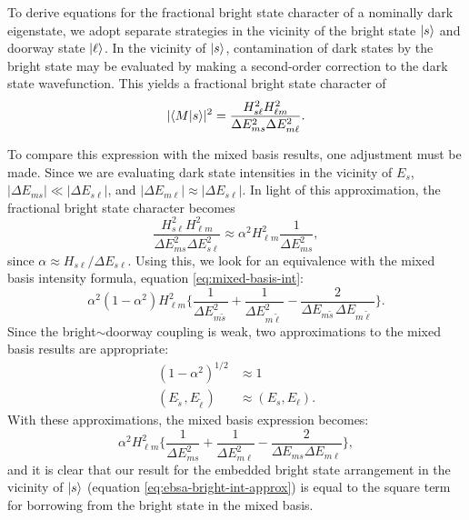 \documentclass[12pt]{mitthesis}
\newcommand{\ts}{\tilde{s}\,}
\newcommand{\tl}{\tilde{\ell}\,}
\begin{document}
To derive equations for the fractional bright state character of a
nominally dark eigenstate, we adopt separate strategies in the vicinity
of the bright state $\mathinner{|{s}\rangle}$ and doorway state $\mathinner{|{\ell}\rangle}$.  In the
vicinity of $\mathinner{|{s}\rangle}$, contamination of dark states by the bright
state may be evaluated by making a second-order correction to the dark
state wavefunction.  This yields a fractional bright state character
of
\begin{equation}\label{eq:ebsa-bright-int}
\lvert \mathinner{\langle{M|s}\rangle} \rvert^2 = 
    \frac{H_{s\ell}^2 H_{\ell m}^2}{\Delta E_{ms}^2 \Delta E_{m\ell}^2}.
\end{equation}

To compare this expression with the mixed basis results, one
adjustment must be made. Since we are evaluating dark state
intensities in the vicinity of $E_s$, $\lvert \Delta E_{ms} \rvert \ll
\lvert \Delta E_{s\ell} \rvert$, and $\lvert \Delta E_{m\ell} \rvert
\approx \lvert \Delta E_{s\ell} \rvert$. In light of this
approximation, the fractional bright state character becomes
\begin{equation}\label{eq:ebsa-bright-int-approx}
  \frac{H_{s\ell}^2 H_{\ell m}^2}{\Delta E_{ms}^2 \Delta E_{s\ell}^2} \approx 
  \alpha^2 H_{\ell m}^2 \frac{1}{\Delta E_{ms}^2},
\end{equation}
since $\alpha \approx H_{s\ell} / \Delta E_{s\ell}$.
Using this, we look for an equivalence with the mixed basis intensity
formula, equation \ref{eq:mixed-basis-int}:
\begin{equation*}
  \alpha^2 (1-\alpha^2) H_{\ell m}^2 
   \biggl \lbrace 
   \frac{1}{\Delta E_{m \ts}^2} +\frac{1}{\Delta E_{m \tl}^2} 
   - \frac{2}{\Delta E_{m \ts} \Delta E_{m \tl}}
   \biggr \rbrace.
\end{equation*}
Since the bright$\sim$doorway coupling is weak, two approximations to
the mixed basis results are appropriate:
\begin{equation}
  \label{eq:weak-coupling-approx}
  \begin{split}
    (1 - \alpha^2)^{1/2} &\approx 1 \\
    (E_{\ts}, E_{\tl}) &\approx (E_s, E_{\ell}).
  \end{split}
\end{equation}
With these approximations, the mixed basis expression becomes:
\begin{equation}
  \label{eq:mixed-basis-int-approx}
  \alpha^2 H_{\ell m}^2 
   \biggl \lbrace 
   \frac{1}{\Delta E_{ms}^2} +\frac{1}{\Delta E_{m\ell}^2} 
   - \frac{2}{\Delta E_{ms} \Delta E_{m\ell}}
   \biggr \rbrace,
\end{equation}
and it is clear that our result for the embedded bright state
arrangement in the vicinity of $\mathinner{|{s}\rangle}$ (equation
\ref{eq:ebsa-bright-int-approx}) is equal to the square term for
borrowing from the bright state in the mixed basis.
\end{document}
